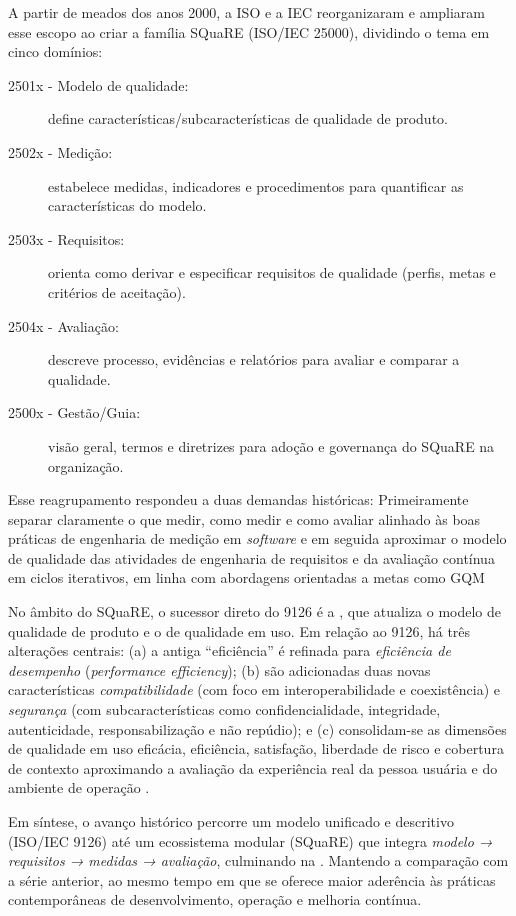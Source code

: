 A partir de meados dos anos 2000, a ISO e a IEC reorganizaram e ampliaram esse escopo ao criar a família SQuaRE (ISO/IEC 25000), 
dividindo o tema em cinco domínios:

\begin{description}
  \item[2501x - Modelo de qualidade:] define características/subcaracterísticas de qualidade de produto.
  \item[2502x - Medição:] estabelece medidas, indicadores e procedimentos para quantificar as características do modelo.
  \item[2503x - Requisitos:] orienta como derivar e especificar requisitos de qualidade (perfis, metas e critérios de aceitação).
  \item[2504x - Avaliação:] descreve processo, evidências e relatórios para avaliar e comparar a qualidade.
  \item[2500x - Gestão/Guia:] visão geral, termos e diretrizes para adoção e governança do SQuaRE na organização.
\end{description}

Esse reagrupamento respondeu a duas demandas históricas: 
Primeiramente separar claramente o que medir, como medir e como avaliar alinhado às boas práticas de engenharia de medição em \textit{software} e 
em seguida aproximar o modelo de qualidade das atividades de engenharia de requisitos e da avaliação contínua em ciclos iterativos, em linha com 
abordagens orientadas a metas como GQM 

No âmbito do SQuaRE, o sucessor direto do 9126 é a \cite{ISOIEC25010}, que atualiza o modelo de qualidade de produto e o de 
qualidade em uso. Em relação ao 9126, há três alterações centrais: (a) a antiga “eficiência” é refinada para \emph{eficiência de desempenho} 
(\textit{performance efficiency}); (b) são adicionadas duas novas características \emph{compatibilidade} (com foco em interoperabilidade e 
coexistência) e \emph{segurança} (com subcaracterísticas como confidencialidade, integridade, autenticidade, responsabilização e não repúdio); 
e (c) consolidam-se as dimensões de qualidade em uso eficácia, eficiência, satisfação, liberdade de risco e cobertura de contexto 
aproximando a avaliação da experiência real da pessoa usuária e do ambiente de operação \cite{Bevan2009}. 

Em síntese, o avanço histórico percorre um modelo unificado e descritivo (ISO/IEC 9126) até um ecossistema modular (SQuaRE) que integra 
\emph{modelo → requisitos → medidas → avaliação}, culminando na \cite{ISOIEC25010}. Mantendo a comparação com a série anterior, 
ao mesmo tempo em que se oferece maior aderência às práticas contemporâneas de desenvolvimento, operação e melhoria contínua.



